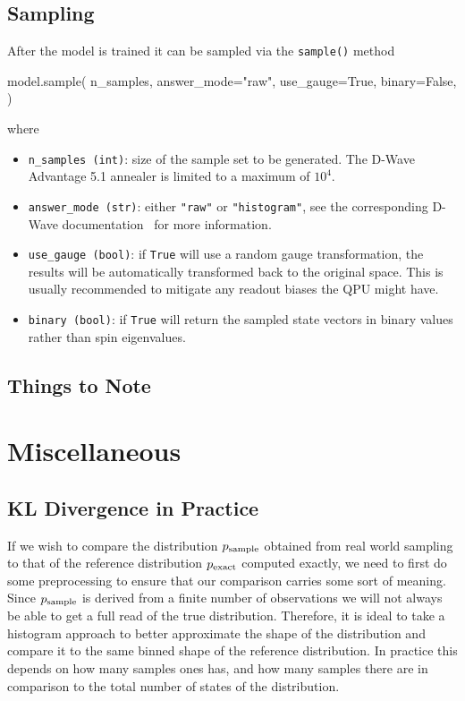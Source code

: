 \subsection{Sampling}
After the model is trained it can be sampled via the \texttt{sample()} method
\begin{python}
model.sample(
    n_samples,
    answer_mode="raw",
    use_gauge=True,
    binary=False,
)
\end{python}
where
\begin{itemize}
    \item \texttt{n\_samples (int)}: size of the sample set to be generated. The D-Wave Advantage 5.1 annealer is limited to a maximum of \( 10^4 \).
    \item \texttt{answer\_mode (str)}: either \texttt{"raw"} or \texttt{"histogram"}, see the corresponding D-Wave documentation~\cite{dwave_solver_parameters} for more information.
    \item \texttt{use\_gauge (bool)}: if \texttt{True} will use a random gauge transformation, the results will be automatically transformed back to the original space. This is usually recommended to mitigate any readout biases the QPU might have.
    \item \texttt{binary (bool)}: if \texttt{True} will return the sampled state vectors in binary values rather than spin eigenvalues.
\end{itemize}

\subsection{Things to Note}

\section{Miscellaneous}
\subsection{KL Divergence in Practice}\label{app:kl_divergence_in_practice}
If we wish to compare the distribution \( p_{\text{sample}} \) obtained from real world sampling to that of the reference distribution \( p_{\text{exact}} \) computed exactly, we need to first do some preprocessing to ensure that our comparison carries some sort of meaning.
Since \( p_{\text{sample}} \) is derived from a finite number of observations we will not always be able to get a full read of the true distribution.
Therefore, it is ideal to take a histogram approach to better approximate the shape of the distribution and compare it to the same binned shape of the reference distribution.
In practice this depends on how many samples ones has, and how many samples there are in comparison to the total number of states of the distribution.

